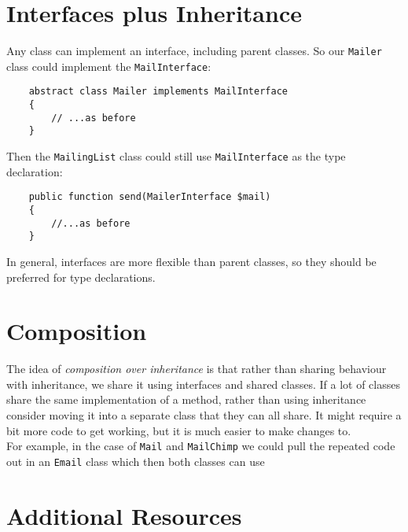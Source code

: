 \section{Interfaces plus Inheritance}

Any class can implement an interface, including parent classes. So our \texttt{Mailer} class could implement the \texttt{MailInterface}:

\begin{verbatim}
    abstract class Mailer implements MailInterface
    {
        // ...as before
    }
\end{verbatim}

\pagebreak

Then the \texttt{MailingList} class could still use \texttt{MailInterface} as the type declaration:

\begin{verbatim}
    public function send(MailerInterface $mail)
    {
        //...as before
    }
\end{verbatim}

In general, interfaces are more flexible than parent classes, so they should be preferred for type declarations.


\section{Composition}


The idea of \textit{composition over inheritance} is that rather than sharing behaviour with inheritance, we share it using interfaces and shared classes. If a lot of classes share the same implementation of a method, rather than using inheritance consider moving it into a separate class that they can all share. It might require a bit more code to get working, but it is much easier to make changes to.
\\

For example, in the case of \texttt{Mail} and \texttt{MailChimp} we could pull the repeated code out in an \texttt{Email} class which then both classes can use



\section{Additional Resources}

